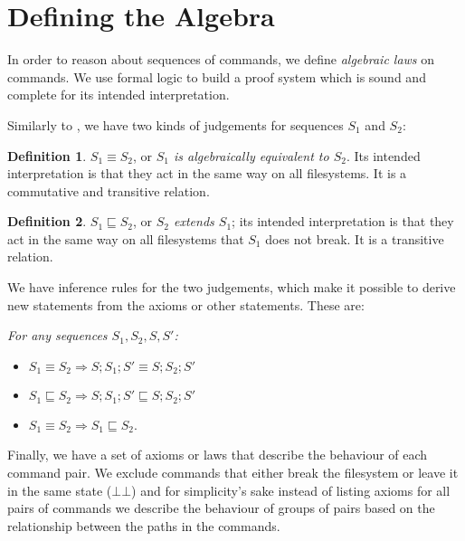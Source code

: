 \documentclass[12pt]{article}
\newcommand{\empt}{\bot}
\newcommand{\fscommand}[2]{{#1#2}}
\newcommand{\fsregcommandchar}[1]{\mathtt{#1}}
\newcommand{\fsregcommand}[2]{\fscommand{\fsregcommandchar{#1}}{\fsregcommandchar{#2}}}
\newcommand{\cbb}{\fsregcommand{\empt}{\empt}}
\newcommand{\eqext}{\sqsubseteq}
\theoremstyle{definition}
\newtheorem{mydef}{Definition}
\begin{document}
\section{Defining the Algebra}

In order to reason about sequences of commands, we define \emph{algebraic laws} on
commands. We use formal logic to build a proof system which is sound and
complete for its intended interpretation.

Similarly to \cite{NREC:alg}, we have two kinds of judgements
for sequences \(S_1\) and \(S_2\):
\begin{mydef}
\(S_1\equiv S_2\), or \emph{\(S_1\) is algebraically equivalent to
\(S_2\)}. Its intended interpretation is that they act in the same way on all
filesystems. It is a commutative and transitive relation.
\end{mydef}
\begin{mydef}
\(S_1\eqext S_2\), or \emph{\(S_2\) extends \(S_1\)}; its intended
interpretation is that they act in the same way on all
filesystems that \(S_1\) does not break. It is a transitive relation.
\end{mydef}

We have inference rules for the two judgements,
which make it possible to derive new statements from the axioms or other statements.
These are:

\emph{For any sequences \(S_1, S_2, S, S'\):}
\begin{itemize}
\item \(S_1\equiv S_2 \Rightarrow S;S_1;S'\equiv S;S_2;S'\)
\item \(S_1\eqext S_2 \Rightarrow S;S_1;S'\eqext S;S_2;S'\)
\item \(S_1\equiv S_2 \Rightarrow S_1\eqext S_2\).
\end{itemize}

Finally, we have a set of axioms or laws that describe the behaviour
of each command pair. We exclude commands that either break the
filesystem or leave it in the same state ($\cbb$) and for
simplicity's sake instead of listing axioms for all pairs of commands
we describe the behaviour of groups of pairs
based on the relationship between the paths in the commands.
\end{document}
